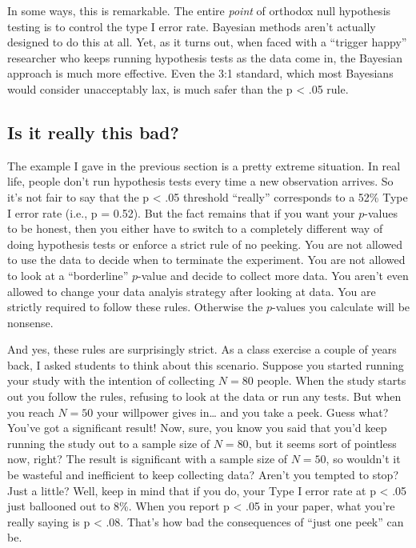 \documentclass[
  a4paper,
]{book}
\begin{document}
In some ways, this is remarkable. The entire \emph{point} of orthodox
null hypothesis testing is to control the type I error rate. Bayesian
methods aren't actually designed to do this at all. Yet, as it turns
out, when faced with a ``trigger happy'' researcher who keeps running
hypothesis tests as the data come in, the Bayesian approach is much more
effective. Even the 3:1 standard, which most Bayesians would consider
unacceptably lax, is much safer than the p \textless{} .05 rule.

\hypertarget{is-it-really-this-bad}{%
\subsection{Is it really this bad?}\label{is-it-really-this-bad}}

The example I gave in the previous section is a pretty extreme
situation. In real life, people don't run hypothesis tests every time a
new observation arrives. So it's not fair to say that the p \textless{}
.05 threshold ``really'' corresponds to a 52\% Type I error rate (i.e.,
p = 0.52). But the fact remains that if you want your \(p\)-values to be
honest, then you either have to switch to a completely different way of
doing hypothesis tests or enforce a strict rule of no peeking. You are
not allowed to use the data to decide when to terminate the experiment.
You are not allowed to look at a ``borderline'' \(p\)-value and decide
to collect more data. You aren't even allowed to change your data
analyis strategy after looking at data. You are strictly required to
follow these rules. Otherwise the \(p\)-values you calculate will be
nonsense.

And yes, these rules are surprisingly strict. As a class exercise a
couple of years back, I asked students to think about this scenario.
Suppose you started running your study with the intention of collecting
\(N = 80\) people. When the study starts out you follow the rules,
refusing to look at the data or run any tests. But when you reach
\(N = 50\) your willpower gives in\ldots{} and you take a peek. Guess
what? You've got a significant result! Now, sure, you know you said that
you'd keep running the study out to a sample size of \(N = 80\), but it
seems sort of pointless now, right? The result is significant with a
sample size of \(N = 50\), so wouldn't it be wasteful and inefficient to
keep collecting data? Aren't you tempted to stop? Just a little? Well,
keep in mind that if you do, your Type I error rate at p \textless{} .05
just ballooned out to 8\%. When you report p \textless{} .05 in your
paper, what you're really saying is p \textless{} .08. That's how bad
the consequences of ``just one peek'' can be.
\end{document}
